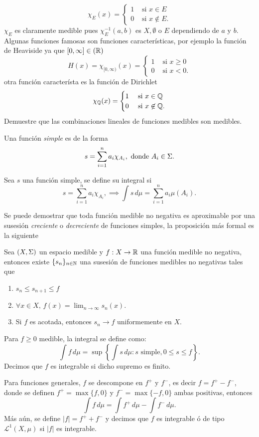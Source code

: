 \documentclass[main.tex]{subfiles}
\begin{document}
\[
\chi_E(x)=
    \begin{cases}
        1 & \text{ si } x\in E \\
        0 & \text{ si } x\not\in E.
    \end{cases}
\]
\noindent $\chi_E$ es claramente medible pues $\chi_E^{-1}(a, b)$ es $X,\emptyset$ o $E$ dependiendo de $a$ y $b$.
\eje Algunas funciones famosas son funciones características, por ejemplo la función de Heaviside ya que $[0,\infty]\in\mathbb(\mathbb R )$
\[
H(x)=\chi_{[0,\infty)}(x)=
    \begin{cases}
        1 & \text{ si } x\geq 0 \\
        0 & \text{ si } x<0.
    \end{cases}
\]
\noindent otra función característa es la función de Dirichlet
\[
\chi_{ \mathbb Q }(x)=
    \begin{cases}
        1 & \text{ si } x\in \mathbb Q  \\
        0 & \text{ si } x\not\in \mathbb Q .
    \end{cases}
\]
\exe Demuestre que las combinaciones lineales de funciones medibles son medibles.
\begin{def.}
Una función \emph{simple} es de la forma
\[
s = \sum_{i=1}^n a_i \chi_{A_i},\text{ donde }A_i \in \Sigma.
\]
\end{def.}
\begin{def.}
Sea $s$ una función simple, se define su integral si
\[
s = \sum_{i=1}^n a_i \chi_{A_i},\implies\int s \, d\mu = \sum_{i=1}^n a_i \mu(A_i).
\]
\end{def.}
\obs Se puede demostrar que toda función medible no negativa es aproximable por una susesión \emph{creciente} o \emph{decreciente} de funciones simples, la proposición más formal es la siguiente
\begin{prop}
  Sea $(X,\Sigma)$ un espacio medible y $f:X\to\mathbb R $ una función medible no negativa, entonces existe $\{s_n\}_{n\in \mathbb N }$ una susesión de funciones medibles no negativas tales que
  \begin{enumerate}
    \item $s_n\leq s_{n+1}\leq f$
    \item $\forall x \in X,\, f(x)=\lim_{n\to\infty}s_n(x).$
    \item Si $f$ es acotada, entonces $s_n\to f$ uniformemente en $X$.
  \end{enumerate}
  \end{prop}
\begin{def.}
Para $f \geq 0$ medible, la integral se define como:
\[
\int f \, d\mu = \sup \left\{ \int s \, d\mu : s \text{ simple}, 0 \leq s \leq f \right\}.
\]
Decimos que $f$ es integrable si dicho supremo es finito.
\end{def.}
\obs Para funciones generales, $f$ se descompone en $f^+$ y $f^-$, es decir $f=f^{+}-f^{-}$, donde se definen $f^+=\max\{f,0\}$ y $f^{-}=\max\{-f,0\}$ ambas positivas, entonces
\[
\int f \, d\mu = \int f^{+}\,d\mu-\int f^{-}\,d\mu.
\]
Más aún, se define $|f|=f^{+}+f^{-}$ y decimos que $f$ es integrable ó de tipo $\mathcal{L}^1(X,\mu)$ si $|f|$ es integrable.
\end{document}
